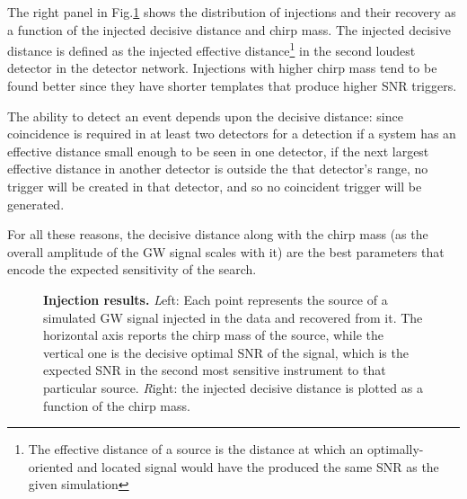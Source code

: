 \documentclass[binding=0.6cm, LaM]{sapthesis}
\begin{document}
        The right panel in Fig.\ref{fig:inj_plots} shows the distribution of injections and their recovery
        as a function of the injected decisive distance and chirp mass.
        The injected decisive distance is  defined as the injected effective
        distance\footnote{The effective distance of a source is the distance at which an optimally-oriented and located signal would have the produced the same SNR as the given simulation }
        in the second   loudest detector in the detector network.
	Injections with higher chirp mass tend to be found better 
	since they have shorter templates that produce higher SNR triggers. 

        The ability to detect an event depends upon the decisive distance:
        since coincidence is required in at least two detectors for a detection
        if a system has an effective distance small enough to be seen in one detector,
        if the next largest effective distance in another detector is outside the that detector’s range,
        no trigger will be created in that detector, and so no coincident trigger will be generated.

        For all these reasons, the decisive distance along with the chirp mass
        (as the overall amplitude of the GW signal scales with it)
        are the best parameters that encode the expected sensitivity of the search.

         \begin{figure}[t]
          \noindent
          \label{inj_plots}
          \centering
          \caption{{\bf Injection results.} {\textit Left:} Each point represents the source of a simulated GW signal injected in the data and recovered from it.  The horizontal axis reports the chirp mass of the source, while the vertical one is the decisive optimal SNR of the signal, which is the expected SNR in the second most sensitive instrument to that particular source. {\textit Right:} the injected decisive distance  is plotted as a function of the chirp mass.}
          \label{fig:inj_plots}
        \end{figure}
\end{document}
